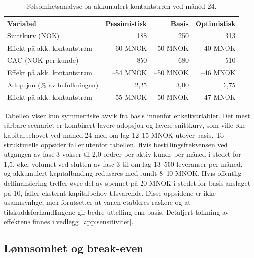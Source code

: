 \begin{table}[h]
\centering
\caption{Følsomhetsanalyse på akkumulert kontantstrøm ved måned 24.}
\label{tab:sensitivitet}
\small
\begin{tabular}{lrrr}
\hline
Variabel & Pessimistisk & Basis & Optimistisk \\
\hline
Snittkurv (NOK) & 188 & 250 & 313 \\
\quad Effekt på akk. kontantstrøm & --60 MNOK & --50 MNOK & --40 MNOK \\
CAC (NOK per kunde) & 850 & 680 & 510 \\
\quad Effekt på akk. kontantstrøm & --54 MNOK & --50 MNOK & --46 MNOK \\
Adopsjon (\% av befolkningen) & 2{,}25 & 3{,}00 & 3{,}75 \\
\quad Effekt på akk. kontantstrøm & --55 MNOK & --50 MNOK & --47 MNOK \\
\hline
\end{tabular}
\end{table}

Tabellen viser kun symmetriske avvik fra basis innenfor enkeltvariabler.
Det mest sårbare scenariet er kombinert lavere adopsjon og lavere
snittkurv, som ville øke kapitalbehovet ved måned 24 med om lag 12--15
MNOK utover basis. To strukturelle oppsider faller utenfor tabellen.
Hvis bestillingsfrekvensen ved utgangen av fase 3 vokser til 2{,}0
ordrer per aktiv kunde per måned i stedet for 1{,}5, øker volumet ved
slutten av fase 3 til om lag 13~500 leveranser per måned, og akkumulert
kapitalbinding reduseres med rundt 8--10 MNOK. Hvis offentlig
delfinansiering treffer øvre del av spennet på 20 MNOK i stedet for
basis-anslaget på 10, faller eksternt kapitalbehov tilsvarende. Disse
oppsidene er ikke usannsynlige, men forutsetter at vanen etableres
raskere og at tilskuddsforhandlingene gir bedre uttelling enn basis.
Detaljert tolkning av effektene finnes i vedlegg~\ref{app:sensitivitet}.

\subsection{Lønnsomhet og break-even}

